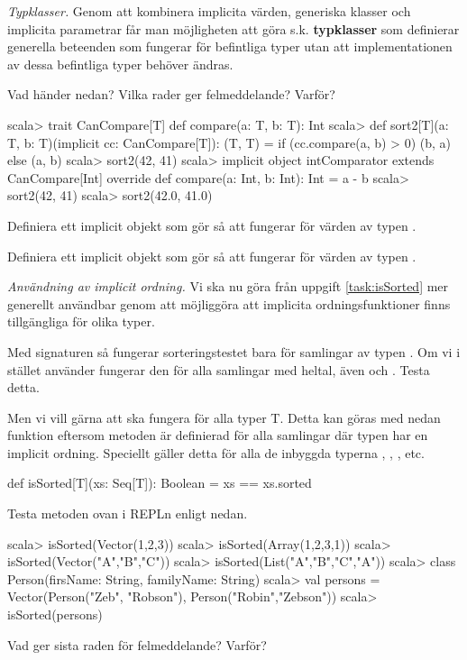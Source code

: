 \Subtask \emph{Typklasser.} Genom att kombinera implicita värden, generiska klasser och implicita parametrar får man möjligheten att göra s.k. \textbf{typklasser} som definierar generella beteenden som fungerar för befintliga typer utan att implementationen av dessa befintliga typer behöver ändras. 

Vad händer nedan? Vilka rader ger felmeddelande? Varför? 

\begin{REPL}
scala> trait CanCompare[T] { def compare(a: T, b: T): Int }
scala> def sort2[T](a: T, b: T)(implicit cc: CanCompare[T]): (T, T) = 
         if (cc.compare(a, b) > 0) (b, a) else (a, b)  
scala> sort2(42, 41)
scala> implicit object intComparator extends CanCompare[Int]{
         override def compare(a: Int, b: Int): Int = a - b
       } 
scala> sort2(42, 41)
scala> sort2(42.0, 41.0)
\end{REPL}

\Subtask Definiera ett implicit objekt som gör så att  fungerar för värden av typen .

\Subtask Definiera ett implicit objekt som gör så att  fungerar för värden av typen .


\Task \label{task:implicit-ordering}\emph{Användning av implicit ordning.} Vi ska nu göra  från uppgift \ref{task:isSorted} mer generellt användbar genom att möjliggöra att implicita ordningsfunktioner finns tillgängliga för olika typer.

\Subtask  Med signaturen   så 
fungerar sorteringstestet bara för samlingar av typen . 
Om vi i stället använder 
 fungerar den för alla samlingar med heltal, även  och . Testa detta.

\Subtask Men vi vill gärna att  ska fungera för alla typer T. Detta kan göras med nedan funktion eftersom metoden  är definierad för alla samlingar där typen  har en implicit ordning. Speciellt gäller detta för alla de inbyggda typerna , , , etc.
\begin{Code}
def isSorted[T](xs: Seq[T]): Boolean = xs == xs.sorted 
\end{Code}
Testa metoden ovan i REPLn enligt nedan.
\begin{REPL}
scala> isSorted(Vector(1,2,3))
scala> isSorted(Array(1,2,3,1))
scala> isSorted(Vector("A","B","C"))
scala> isSorted(List("A","B","C","A"))
scala> class Person(firsName: String, familyName: String)
scala> val persons = Vector(Person("Zeb", "Robson"), Person("Robin","Zebson")) 
scala> isSorted(persons)
\end{REPL}
Vad ger sista raden för felmeddelande? Varför?


